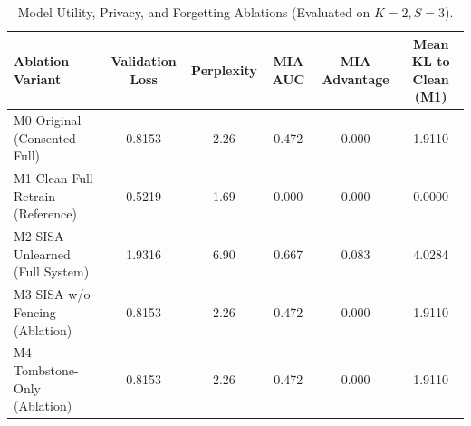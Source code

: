 \begin{table}[t]
\centering
\small
\caption{Model Utility, Privacy, and Forgetting Ablations (Evaluated on $K=2, S=3$).}
\label{tab:utility}
\begin{tabular}{lccccc}
\toprule
\textbf{Ablation Variant} & \textbf{Validation Loss} & \textbf{Perplexity} & \textbf{MIA AUC} & \textbf{MIA Advantage} & \textbf{Mean KL to Clean (M1)} \\
\midrule
M0 Original (Consented Full) & 0.8153 & 2.26 & 0.472 & 0.000 & 1.9110 \\
M1 Clean Full Retrain (Reference) & 0.5219 & 1.69 & 0.000 & 0.000 & 0.0000 \\
M2 SISA Unlearned (Full System) & 1.9316 & 6.90 & 0.667 & 0.083 & 4.0284 \\
M3 SISA w/o Fencing (Ablation) & 0.8153 & 2.26 & 0.472 & 0.000 & 1.9110 \\
M4 Tombstone-Only (Ablation) & 0.8153 & 2.26 & 0.472 & 0.000 & 1.9110 \\
\bottomrule
\end{tabular}
\end{table}

